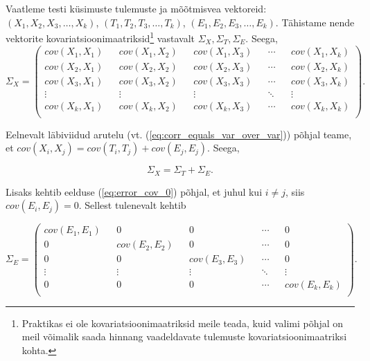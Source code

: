 \documentclass[a4paper,12pt,oneside]{article}
\numberwithin{equation}{section}
\theoremstyle{definition}
\begin{document}
Vaatleme testi k\"usimuste tulemuste ja mõõtmisvea vektoreid: $\left( X_1, X_2, X_3, \ldots, X_k \right)$, $\left( T_1, T_2, T_3, \ldots, T_k \right)$, $\left( E_1, E_2, E_3, \ldots, E_k \right)$. Tähistame nende vektorite kovariatsioonimaatriksid\footnote{ Praktikas ei ole kovariatsioonimaatriksid meile teada, kuid valimi põhjal on meil võimalik saada hinnang vaadeldavate tulemuste kovariatsioonimaatriksi kohta.} vastavalt $\Sigma_X, \Sigma_T, \Sigma_E$. Seega, 
\small
\begin{equation*}
\Sigma_X = 
\begin{pmatrix}
cov \left(X_1,X_1 \right) && cov\left( X_1,X_2 \right) && cov \left( X_1,X_3 \right) && \cdots && cov \left( X_1,X_k \right) \\
cov \left(X_2, X_1 \right) && cov \left(X_2, X_2 \right) && cov \left(X_2, X_3 \right) && \cdots && cov \left(X_2, X_k \right) \\
cov \left(X_3, X_1 \right) && cov \left(X_3, X_2 \right) && cov \left(X_3, X_3 \right) && \cdots && cov \left(X_3, X_k \right) \\
\vdots && \vdots && \vdots && \ddots && \vdots \\
cov \left(X_k, X_1 \right) && cov \left(X_k, X_2 \right) && cov \left(X_k, X_3 \right) && \cdots && cov \left(X_k, X_k \right) \\
\end{pmatrix}.
\end{equation*}
\normalsize

Eelnevalt läbiviidud arutelu (vt. (\ref{eq:corr_equals_var_over_var})) põhjal teame, et $cov(X_i,X_j) = cov(T_i,T_j) + cov(E_j,E_j)$. Seega, 

\begin{equation}
\label{eq:sigma_x_=_sigma_t_+_sigma_e}
\Sigma_X = \Sigma_T + \Sigma_E \text{.}
\end{equation}

Lisaks kehtib eelduse (\ref{eq:error_cov_0}) põhjal, et juhul kui $i \neq j$, siis $cov \left( E_i, E_j \right) = 0$.
Sellest tulenevalt kehtib

\small
\begin{equation}
\label{eq:sigma_E}
\Sigma_E = 
\begin{pmatrix}
cov \left(E_1,E_1 \right) && 0 && 0 && \cdots && 0 \\
0 && cov \left(E_2, E_2 \right) && 0 && \cdots && 0 \\
0 && 0 && cov \left(E_3, E_3 \right) && \cdots && 0 \\
\vdots && \vdots && \vdots && \ddots && \vdots \\
0 && 0 &&  0 && \cdots && cov \left(E_k, E_k \right) \\
\end{pmatrix}.
\end{equation}
\normalsize
\end{document}
